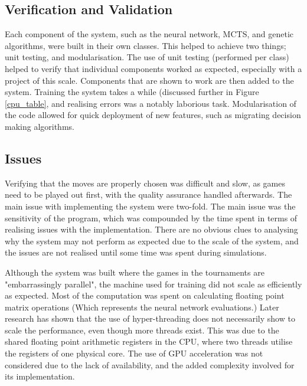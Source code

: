 \documentclass[12pt,a4paper]{article}
\begin{document}
    \subsection{Verification and Validation}

        Each component of the system, such as the neural network, MCTS, and genetic algorithms, were built in their own classes. This helped to achieve two things; unit testing, and modularisation. The use of unit testing (performed per class) helped to verify that individual components worked as expected, especially with a project of this scale. Components that are shown to work are then added to the system. Training the system takes a while (discussed further in Figure \ref{cpu_table}, and realising errors was a notably laborious task. Modularisation of the code allowed for quick deployment of new features, such as migrating decision making algorithms.


    \subsection{Issues}
        Verifying that the moves are properly chosen was difficult and slow, as games need to be played out first, with the quality assurance handled afterwards. The main issue with implementing the system were two-fold. The main issue was the sensitivity of the program, which was compounded by the time spent in terms of realising issues with the implementation. There are no obvious clues to analysing why the system may not perform as expected due to the scale of the system, and the issues are not realised until some time was spent during simulations. 

        Although the system was built where the games in the tournaments are "embarrassingly parallel", the machine used for training did not scale as efficiently as expected. Most of the computation was spent on calculating floating point matrix operations (Which represents the neural network evaluations.) Later research has shown that the use of hyper-threading does not necessarily show to scale the performance, even though more threads exist. \cite{leng_empirical_2002} This was due to the shared floating point arithmetic registers in the CPU, where two threads utilise the registers of one physical core. The use of GPU acceleration was not considered due to the lack of availability, and the added complexity involved for its implementation. 
    
\end{document}
